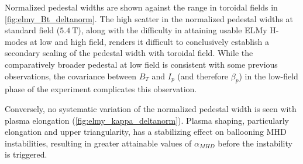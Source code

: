 Normalized pedestal widths are shown against the range in toroidal fields in \cref{fig:elmy_Bt_deltanorm}.  The high scatter in the normalized pedestal widths at standard field ($\SI{5.4}{\tesla}$), along with the difficulty in attaining usable ELMy H-modes at low and high field, renders it difficult to conclusively establish a secondary scaling of the pedestal width with toroidal field.  While the comparatively broader pedestal at low field is consistent with some previous observations, the covariance between $B_T$ and $I_p$ (and therefore $\beta_p$) in the low-field phase of the experiment complicates this observation.

\begin{figure}
 \pushtooutside
\end{figure}

Conversely, no systematic variation of the normalized pedestal width is seen with plasma elongation (\cref{fig:elmy_kappa_deltanorm}).  Plasma shaping, particularly elongation and upper triangularity, has a stabilizing effect on ballooning MHD instabilities, resulting in greater attainable values of $\alpha_{MHD}$ before the instability is triggered.  

